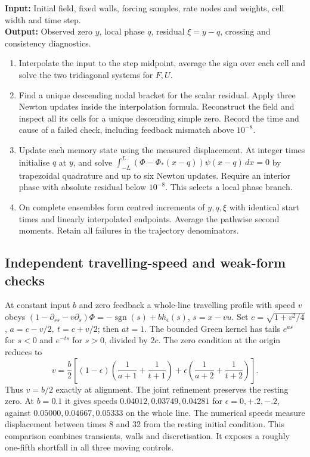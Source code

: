 \documentclass[11pt]{article}
\begin{document}
\begin{algorithm}[htbp]
\caption{Evolving a field coupled to its observed zero}\small
\textbf{Input:} Initial field, fixed walls, forcing samples, rate nodes and weights, cell width and time step.\\
\textbf{Output:} Observed zero \(y\), local phase \(q\), residual \(\xi=y-q\), crossing and consistency diagnostics.
\begin{enumerate}\setlength{\itemsep}{.1em}
\item Interpolate the input to the step midpoint, average the sign over each cell and solve the two tridiagonal systems for \(F,U\).
\item Find a unique descending nodal bracket for the scalar residual. Apply three Newton updates inside the interpolation formula. Reconstruct the field and inspect all its cells for a unique descending simple zero. Record the time and cause of a failed check, including feedback mismatch above \(10^{-8}\).
\item Update each memory state using the measured displacement. At integer times initialise \(q\) at \(y\), and solve \(\int_{-L}^{L}(\Phi-\Phi_*(x-q))\psi(x-q)\,dx=0\) by trapezoidal quadrature and up to six Newton updates. Require an interior phase with absolute residual below \(10^{-8}\). This selects a local phase branch.
\item On complete ensembles form centred increments of \(y,q,\xi\) with identical start times and linearly interpolated endpoints. Average the pathwise second moments. Retain all failures in the trajectory denominators.
\end{enumerate}
\end{algorithm}

\subsection{Independent travelling-speed and weak-form checks}
At constant input \(b\) and zero feedback a whole-line travelling profile
with speed \(v\) obeys \((1-\partial_{ss}-v\partial_s)\Phi
=-\operatorname{sgn}(s)+b h_\epsilon(s)\), \(s=x-vu\).
Set \(c=\sqrt{1+v^2/4}\), \(a=c-v/2,\ t=c+v/2\); then \(at=1\).
The bounded Green kernel has tails \(e^{as}\) for \(s<0\) and
\(e^{-ts}\) for \(s>0\), divided by \(2c\).
The zero condition at the origin reduces to
\begin{equation}
 v=\frac b2\left[(1-\epsilon)
 \left(\frac1{a+1}+\frac1{t+1}\right)+\epsilon
 \left(\frac1{a+2}+\frac1{t+2}\right)\right].\label{eq:nonlinear-speed}
\end{equation}
Thus \(v=b/2\) exactly at alignment. The joint refinement preserves the
resting zero. At \(b=0.1\) it gives speeds \(0.04012,0.03749,0.04281\)
for \(\epsilon=0,+.2,-.2\), against \(0.05000,0.04667,0.05333\)
on the whole line. The numerical speeds measure displacement between
times 8 and 32 from the resting initial condition. This comparison
combines transients, walls and discretisation. It exposes a roughly
one-fifth shortfall in all three moving controls.
\end{document}
